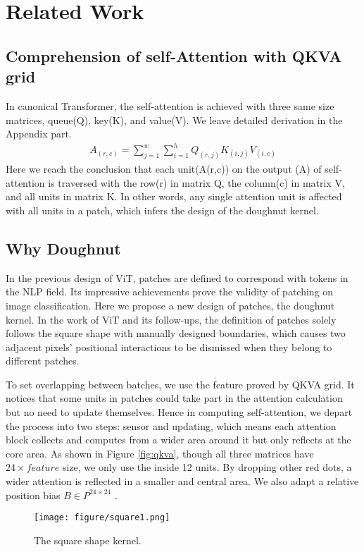 \documentclass{article}
\theoremstyle{plain}
\theoremstyle{definition}
\theoremstyle{remark}
\begin{document}
\section{Related Work}
\subsection{Comprehension of self-Attention with QKVA grid}
In canonical Transformer, the self-attention is achieved with three same size matrices, queue(Q), key(K), and value(V). We leave detailed derivation in the Appendix part.
\begin{align}
\label{form:qkva}
A_{(r,c)}=\sum_{j=1}^w \sum_{i=1}^h Q_{(r,j)}K_{(i,j)}V_{(i,c)} 
\end{align}
Here we reach the conclusion that each unit(A(r,c)) on the output (A) of self-attention is traversed with the row(r) in matrix Q, the column(c) in matrix V, and all units in matrix K. In other words, any single attention unit is affected with all units in a patch, which infers the design of the doughnut kernel.

\subsection{Why Doughnut}
In the previous design of ViT, patches are defined to correspond with tokens in the NLP field. Its impressive achievements prove the validity of patching on image classification. Here we propose a new design of patches, the doughnut kernel. In the work of ViT and its follow-ups, the definition of patches solely follows the square shape with manually designed boundaries, which causes two adjacent pixels' positional interactions to be dismissed when they belong to different patches. 

To set overlapping between batches, we use the feature proved by QKVA grid. It notices that some units in patches could take part in the attention calculation but no need to update themselves. Hence in computing self-attention, we depart the process into two steps: sensor and updating, which means each attention block collects and computes from a wider area around it but only reflects at the core area. 
As shown in Figure \ref{fig:qkva}, though all three matrices have $24{\times}feature$ size, we only use the inside 12 units. By dropping other red dots, a wider attention is reflected in a smaller and central area. We also adapt a relative position bias $B\in P^{24\times24}$ \cite{liu2021swin}.

\begin{figure}[h]
\centering
    \texttt{[image: figure/square1.png]}
\caption{The square shape kernel.}
\label{fig:square}
\end{figure}
\end{document}
